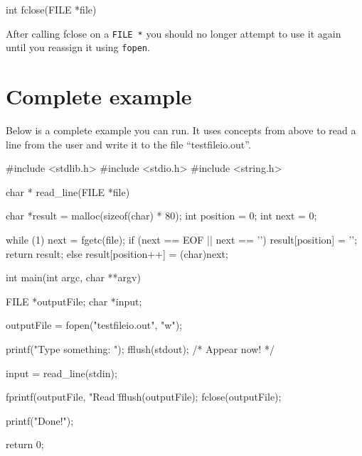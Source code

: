 \begin{codeinline}
int fclose(FILE *file)
\end{codeinline}

After calling fclose on a \texttt{FILE *} you should no longer attempt to use it again until you reassign it using \texttt{fopen}.

\section{Complete example}

Below is a complete example you can run. 
It uses concepts from above to read a line from the user and write it to the file ``testfileio.out''.

\begin{codeblock}
#include <stdlib.h>
#include <stdio.h>
#include <string.h>

char *
read_line(FILE *file)
{
    char *result = malloc(sizeof(char) * 80);
    int position = 0;
    int next = 0;

    while (1) {
        next = fgetc(file);
        if (next == EOF || next == '\n') {
            result[position] = '\0';
            return result;
        } else {
            result[position++] = (char)next;
        }
    }
}

int
main(int argc, char **argv)
{
    FILE *outputFile;
    char *input;

    outputFile = fopen("testfileio.out", "w");

    printf("Type something: ");
    fflush(stdout); /* Appear now! */

    input = read_line(stdin);

    fprintf(outputFile, "Read \"%
    fflush(outputFile);
    fclose(outputFile);

    printf("Done!\n");

    return 0;
}
\end{codeblock}
